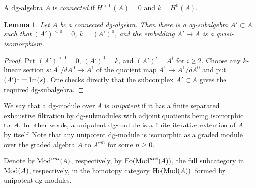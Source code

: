 \documentclass[10pt,russian]{article}
\theoremstyle{plain}
\newtheorem{lemma}[theorem]{Lemma}
\theoremstyle{definition}
\newcommand{\Mod}{{\rm Mod}}
\newcommand{\Ho}{{\rm Ho}}
\begin{document}
A dg-algebra $A$ is \emph{connected} if $H^{<0}(A)=0$ and $k=H^0(A)$.

\begin{lemma}\label{lem:subalgebra}
Let $A$ be a connected dg-algebra. Then there is a dg-subalgebra $A'\subset A$ such that $(A')^{<0}=0$, $k=(A')^0$, and the embedding $A'\to A$ is a quasi-isomorphism.
\end{lemma}
\begin{proof}
Put $(A')^{<0}=0$, $(A')^0=k$, and ${(A')^i=A^i}$ for $i\geqslant 2$. Choose any $k$-linear section $s\colon A^1/dA^0\to A^1$ of the quotient map ${A^1\to A^1/dA^0}$ and put ${(A')^1={\rm Im}(s)}$. One checks directly that the subcomplex $A'\subset A$ gives the required dg-subalgebra.
\end{proof}
\medskip
We say that a dg-module over $A$ is \emph{unipotent} if it has a finite separated exhaustive filtration by dg-submodules with adjoint quotients being isomorphic to~$A$. In other words, a unipotent dg-module is a finite iterative extention of $A$ by itself. Note that any unipotent dg-module is isomorphic as a graded module over the graded algebra $A$ to $A^{\oplus n}$ for some $n\geqslant 0$.

Denote by $\Mod^{uni}(A)$, respectively, by $\Ho(\Mod^{uni}(A))$,  the full subcategory in $\Mod(A)$, respectively, in  the homotopy category $\Ho(\Mod(A))$, formed by unipotent dg-modules.
\end{document}
